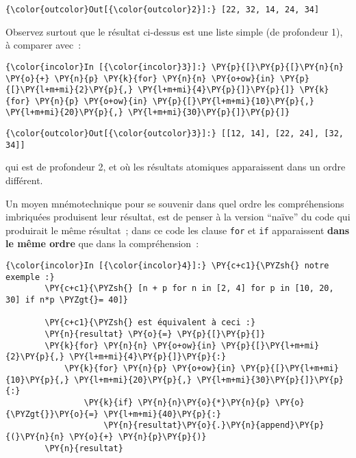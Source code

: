 \begin{Verbatim}[commandchars=\\\{\},frame=single,framerule=0.3mm,rulecolor=\color{cellframecolor}]
{\color{outcolor}Out[{\color{outcolor}2}]:} [22, 32, 14, 24, 34]
\end{Verbatim}
            
    Observez surtout que le résultat ci-dessus est une liste simple (de
profondeur 1), à comparer avec~:

    \begin{Verbatim}[commandchars=\\\{\},frame=single,framerule=0.3mm,rulecolor=\color{cellframecolor}]
{\color{incolor}In [{\color{incolor}3}]:} \PY{p}{[}\PY{p}{[}\PY{n}{n} \PY{o}{+} \PY{n}{p} \PY{k}{for} \PY{n}{n} \PY{o+ow}{in} \PY{p}{[}\PY{l+m+mi}{2}\PY{p}{,} \PY{l+m+mi}{4}\PY{p}{]}\PY{p}{]} \PY{k}{for} \PY{n}{p} \PY{o+ow}{in} \PY{p}{[}\PY{l+m+mi}{10}\PY{p}{,} \PY{l+m+mi}{20}\PY{p}{,} \PY{l+m+mi}{30}\PY{p}{]}\PY{p}{]}
\end{Verbatim}


\begin{Verbatim}[commandchars=\\\{\},frame=single,framerule=0.3mm,rulecolor=\color{cellframecolor}]
{\color{outcolor}Out[{\color{outcolor}3}]:} [[12, 14], [22, 24], [32, 34]]
\end{Verbatim}
            
    qui est de profondeur 2, et où les résultats atomiques apparaissent dans
un ordre différent.

    Un moyen mnémotechnique pour se souvenir dans quel ordre les
compréhensions imbriquées produisent leur résultat, est de penser à la
version ``naïve'' du code qui produirait le même résultat~; dans ce code
les clause \texttt{for} et \texttt{if} apparaissent \textbf{dans le même
ordre} que dans la compréhension~:

    \begin{Verbatim}[commandchars=\\\{\},frame=single,framerule=0.3mm,rulecolor=\color{cellframecolor}]
{\color{incolor}In [{\color{incolor}4}]:} \PY{c+c1}{\PYZsh{} notre exemple :}
        \PY{c+c1}{\PYZsh{} [n + p for n in [2, 4] for p in [10, 20, 30] if n*p \PYZgt{}= 40]}
        
        \PY{c+c1}{\PYZsh{} est équivalent à ceci :}
        \PY{n}{resultat} \PY{o}{=} \PY{p}{[}\PY{p}{]}
        \PY{k}{for} \PY{n}{n} \PY{o+ow}{in} \PY{p}{[}\PY{l+m+mi}{2}\PY{p}{,} \PY{l+m+mi}{4}\PY{p}{]}\PY{p}{:}
            \PY{k}{for} \PY{n}{p} \PY{o+ow}{in} \PY{p}{[}\PY{l+m+mi}{10}\PY{p}{,} \PY{l+m+mi}{20}\PY{p}{,} \PY{l+m+mi}{30}\PY{p}{]}\PY{p}{:}
                \PY{k}{if} \PY{n}{n}\PY{o}{*}\PY{n}{p} \PY{o}{\PYZgt{}}\PY{o}{=} \PY{l+m+mi}{40}\PY{p}{:}
                    \PY{n}{resultat}\PY{o}{.}\PY{n}{append}\PY{p}{(}\PY{n}{n} \PY{o}{+} \PY{n}{p}\PY{p}{)}
        \PY{n}{resultat}
\end{Verbatim}


